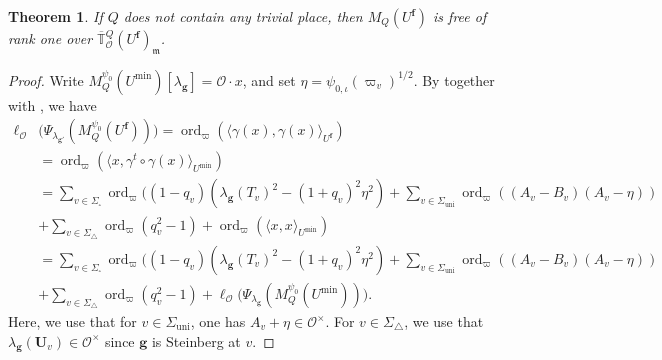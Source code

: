 \documentclass[a4paper, notitlepage, 10pt]{amsart}
\theoremstyle{plain} %
\newtheorem{theorem}{Theorem}[section]
\theoremstyle{definition} %
\theoremstyle{remark} %
\numberwithin{equation}{section}
\newcommand{\ord}{\operatorname{ord}} %
\newcommand{\uni}{\operatorname{uni}}
\begin{document}
 \begin{theorem}\label{freenesswithouttrivialplaces}
     If $Q$ does not contain any trivial place, then $M_Q(U^{\mathbf{f}})$ is free of rank one over $\overline{\mathbb{T}}{}^{Q}_{\mathcal{O}}(U^{\mathbf{f}})_{\mathfrak{m}}$.
 \end{theorem}
 \begin{proof}
Write $M_Q^{\psi_0}(U^{\min})[\lambda_{\mathbf{g}}]=\mathcal{O}\cdot x$, and set $\eta=\psi_{0,\iota}(\varpi_v)^{1/2}$. By \cite[Lemma 3.5]{BKM1} together with , we have 
\begin{align*}
    \ell_{\mathcal{O}}&\big(\Psi_{\lambda_{\mathbf{g'}}}(M^{\psi_0}_Q(U^{\mathbf{f}}))\big)= \ord_{\varpi}(\langle \gamma(x),\gamma(x)\rangle_{U^{\mathbf{f}}})
    \\ &= \ord_{\varpi}(\langle x,\gamma^t\circ\gamma(x)\rangle_{U^{\min}})
    \\ &= \sum_{v\in \Sigma_\square} \ord_{\varpi}((1-q_v)(\lambda_{\mathbf{g}}(T_v)^2-(1+q_v)^2\eta^2)
     +\sum_{v\in \Sigma_{\uni}}\ord_{\varpi}((A_v-B_v)(A_v-\eta))
     \\ &+ \sum_{v\in\Sigma_{\triangle}}\ord_{\varpi}(q_v^2-1)+\ord_{\varpi}(\langle x,x\rangle_{U^{\min}})
    \\ &= \sum_{v\in \Sigma_\square} \ord_{\varpi}((1-q_v)(\lambda_{\mathbf{g}}(T_v)^2-(1+q_v)^2\eta^2)
    + \sum_{v\in \Sigma_{\uni}}\ord_{\varpi}((A_v-B_v)(A_v-\eta))
     \\ &+ \sum_{v\in\Sigma_{\triangle}}\ord_{\varpi}(q_v^2-1)+ \ell_{\mathcal{O}}\big(\Psi_{\lambda_{\mathbf{g}}}(M^{\psi_0}_Q(U^{\min}))\big).
\end{align*}
Here, we use that for $v\in \Sigma_{\uni}$, one has $A_v+\eta\in \mathcal{O}^\times$. For $v\in \Sigma_{\triangle}$, we use that $\lambda_{\mathbf{g}}(\mathbf{U}_v)\in \mathcal{O}^\times$ since $\mathbf{g}$ is Steinberg at $v$. 


\end{proof}
\end{document}
